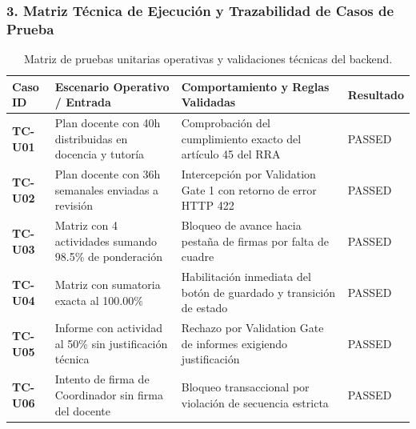 \documentclass[12pt,a4paper]{article}
\begin{document}
\subsubsection*{3. Matriz Técnica de Ejecución y Trazabilidad de Casos de Prueba}
\begin{table}[H]
\centering
\small
\renewcommand{\arraystretch}{1.2}
\begin{tabularx}{\textwidth}{|>{\hsize=0.55\hsize\centering\arraybackslash\bfseries\footnotesize}X|>{\hsize=1.25\hsize\raggedright\arraybackslash\footnotesize}X|>{\hsize=1.65\hsize\raggedright\arraybackslash\footnotesize}X|>{\hsize=0.55\hsize\centering\arraybackslash\footnotesize}X|}
\hline
\rowcolor{tableheader}
\textbf{Caso ID} & \textbf{Escenario Operativo / Entrada} & \textbf{Comportamiento y Reglas Validadas} & \textbf{Resultado} \\
\hline
TC-U01 & Plan docente con 40h distribuidas en docencia y tutoría & Comprobación del cumplimiento exacto del artículo 45 del RRA & PASSED \\
\hline
TC-U02 & Plan docente con 36h semanales enviadas a revisión & Intercepción por Validation Gate 1 con retorno de error HTTP 422 & PASSED \\
\hline
TC-U03 & Matriz con 4 actividades sumando 98.5\% de ponderación & Bloqueo de avance hacia pestaña de firmas por falta de cuadre & PASSED \\
\hline
TC-U04 & Matriz con sumatoria exacta al 100.00\% & Habilitación inmediata del botón de guardado y transición de estado & PASSED \\
\hline
TC-U05 & Informe con actividad al 50\% sin justificación técnica & Rechazo por Validation Gate de informes exigiendo justificación & PASSED \\
\hline
TC-U06 & Intento de firma de Coordinador sin firma del docente & Bloqueo transaccional por violación de secuencia estricta & PASSED \\
\hline
\end{tabularx}
\caption{Matriz de pruebas unitarias operativas y validaciones técnicas del backend.}
\end{table}
\end{document}
